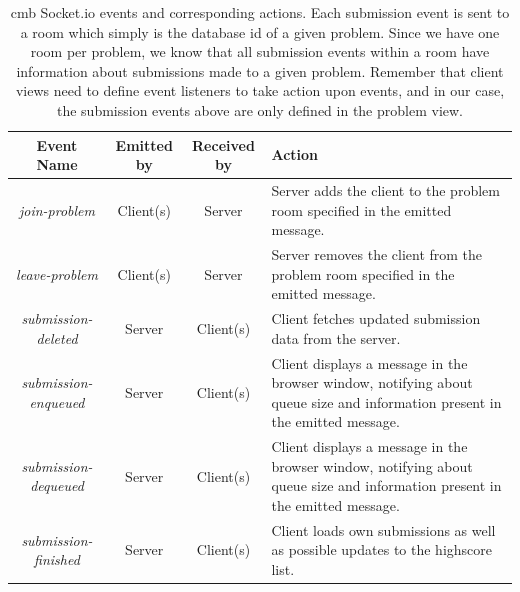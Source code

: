\begin{table}[t!]
    \centering
    \begin{tabular}{ | c | c | c | p{3.5cm} | }
    \hline
    \textbf{Event Name} & \textbf{Emitted by} & \textbf{Received by} & \textbf{Action}\\
    \hline
    \textit{join-problem} & Client(s) & Server & Server adds the client to the problem room specified in the emitted message. \\ \hline
    \textit{leave-problem} & Client(s) & Server & Server removes the client from the problem room specified in the emitted message. \\ \hline
    \textit{submission-deleted} & Server & Client(s) & Client fetches updated submission data from the server. \\ \hline
    \textit{submission-enqueued} & Server & Client(s) & Client displays a message in the browser window, notifying about queue size and information present in the emitted message. \\ \hline
    \textit{submission-dequeued} & Server & Client(s) & Client displays a message in the browser window, notifying about queue size and information present in the emitted message. \\ \hline
    \textit{submission-finished} & Server & Client(s) & Client loads own submissions as well as possible updates to the highscore list. \\ \hline
    \end{tabular}
    \caption[Climbing Mont Blanc Socket.io events and corresponding actions]{\gls{cmb} Socket.io events and corresponding actions. Each submission event is sent to a room which simply is the database id of a given problem. Since we have one room per problem, we know that all submission events within a room have information about submissions made to a given problem. Remember that client views need to define event listeners to take action upon events, and in our case, the submission events above are only defined in the problem view.}
    \label{tab:cmb-socketio-events}
\end{table}

